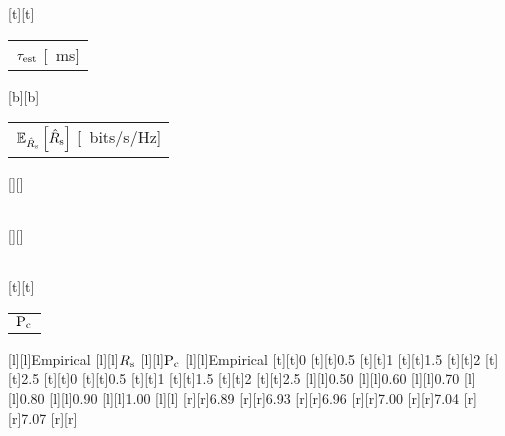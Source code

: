 %    
%
%
%
[t][t]{\fontsize{8}{12}\selectfont \color[rgb]{0,0,0}\setlength{\tabcolsep}{0pt}\begin{tabular}{c}$\tau_{\text{est}}$ [\SI{}{ms}]\end{tabular}}%
[b][b]{\fontsize{8}{12}\selectfont \color[rgb]{0,0,0}\setlength{\tabcolsep}{0pt}\begin{tabular}{c}${\mathbb E}_{\hat{{{R}}}_{\text{s}}}\left[ \hat{{{R}}}_{\text{s}} \right]$ [\SI{}{bits/s/Hz}]\end{tabular}}%
[][]{\fontsize{10}{15}\selectfont \color[rgb]{0,0,0}\setlength{\tabcolsep}{0pt}\begin{tabular}{c} \end{tabular}}%
[][]{\fontsize{10}{15}\selectfont \color[rgb]{0,0,0}\setlength{\tabcolsep}{0pt}\begin{tabular}{c} \end{tabular}}%
[t][t]{\fontsize{8}{12}\selectfont \color[rgb]{0,0,0}\setlength{\tabcolsep}{0pt}\begin{tabular}{c}$\text{P}_{\text{c}}$\end{tabular}}%
[l][l]{\fontsize{8}{12}\selectfont \color[rgb]{0,0,0}Empirical}%
[l][l]{\fontsize{8}{12}\selectfont \color[rgb]{0,0,0}$R_{\text{s}}$}%
[l][l]{\fontsize{8}{12}\selectfont \color[rgb]{0,0,0}$\text{P}_{\text{c}}$}%
[l][l]{\fontsize{8}{12}\selectfont \color[rgb]{0,0,0}Empirical}%
%
\fontsize{8}{12}%
\selectfont%
%
[t][t]{0}%
[t][t]{0.5}%
[t][t]{1}%
[t][t]{1.5}%
[t][t]{2}%
[t][t]{2.5}%
[t][t]{0}%
[t][t]{0.5}%
[t][t]{1}%
[t][t]{1.5}%
[t][t]{2}%
[t][t]{2.5}%
%
[l][l]{0.50}%
[l][l]{0.60}%
[l][l]{0.70}%
[l][l]{0.80}%
[l][l]{0.90}%
[l][l]{1.00}%
[l][l]{}%
[r][r]{6.89}%
[r][r]{6.93}%
[r][r]{6.96}%
[r][r]{7.00}%
[r][r]{7.04}%
[r][r]{7.07}%
[r][r]{}%
%
%
